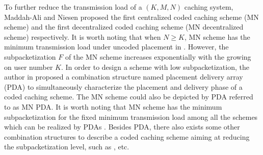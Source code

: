 \documentclass[onecolumn,10pt]{IEEEtran}
\theoremstyle{mythm}
\begin{document}
To further reduce the transmission load of a $(K,M,N)$ caching system, Maddah-Ali and Niesen proposed the first centralized coded caching scheme \cite{MN} (MN scheme) and the first decentralized coded caching scheme \cite{MND} (MN decentralized scheme) respectively.
It is worth noting that when $N\geq K$, MN scheme has the minimum transmission load under uncoded placement in \cite{WTDPP}.  However, the subpacketization $F$ of the MN scheme increases exponentially with the growing on user number $K$. In order to design a scheme with low subpacketization, the author in \cite{YCTC} proposed a combination structure named placement delivery array (PDA) to simultaneously characterize the placement and delivery phase of a coded caching scheme. The MN scheme could also be depicted by PDA referred to as MN PDA. It is worth noting that MN scheme has the minimum subpacketization for the fixed minimum transmission load among all the schemes which can be realized by PDAs \cite{CJTY}. Besides PDA, there also exists some other combination structures to describe a coded caching scheme aiming at reducing the subpacketization level, such as \cite{SCZYG,YTCC,CLTW}, etc.

\end{document}
